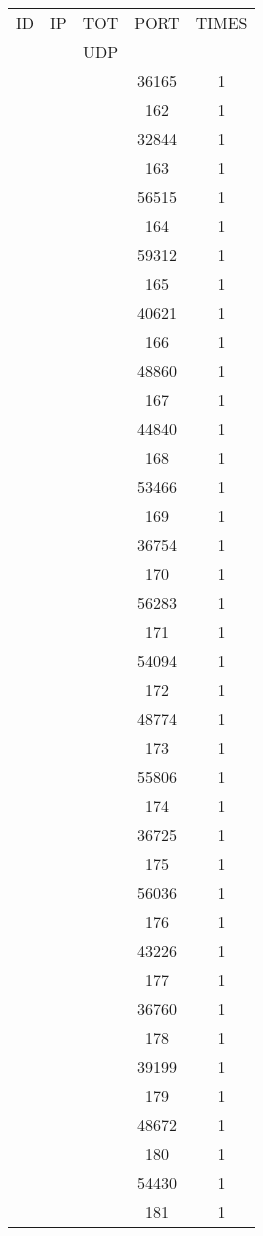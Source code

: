 \documentclass[a4paper]{scrartcl}
\begin{document}
\begin{minipage}[b]{0.5\linewidth}
\begin{tabular}{| c | c | c | c | c |}
\hline
ID & IP & TOT & PORT & TIMES \\ 
   &    & UDP &      &       \\ 
\hline
& & & 36165 & 1 \\ & & & 162 & 1 \\ & & & 32844 & 1 \\ & & & 163 & 1 \\ & & & 56515 & 1 \\ & & & 164 & 1 \\ & & & 59312 & 1 \\ & & & 165 & 1 \\ & & & 40621 & 1 \\ & & & 166 & 1 \\ & & & 48860 & 1 \\ & & & 167 & 1 \\ & & & 44840 & 1 \\ & & & 168 & 1 \\ & & & 53466 & 1 \\ & & & 169 & 1 \\ & & & 36754 & 1 \\ & & & 170 & 1 \\ & & & 56283 & 1 \\ & & & 171 & 1 \\ & & & 54094 & 1 \\ & & & 172 & 1 \\ & & & 48774 & 1 \\ & & & 173 & 1 \\ & & & 55806 & 1 \\ & & & 174 & 1 \\ & & & 36725 & 1 \\ & & & 175 & 1 \\ & & & 56036 & 1 \\ & & & 176 & 1 \\ & & & 43226 & 1 \\ & & & 177 & 1 \\ & & & 36760 & 1 \\ & & & 178 & 1 \\ & & & 39199 & 1 \\ & & & 179 & 1 \\ & & & 48672 & 1 \\ & & & 180 & 1 \\ & & & 54430 & 1 \\ & & & 181 & 1 \\ \hline\end{tabular}\end{minipage} \hfill\begin{minipage}[b]{0.5\linewidth}\begin{tabular}{| c | c | c | c | c |}

\end{tabular}
\end{minipage}
\end{document}
